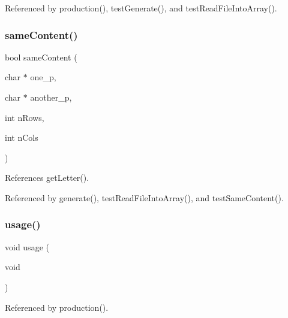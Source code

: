 Referenced by production(), test\+Generate(), and test\+Read\+File\+Into\+Array().

\mbox{\label{production_8h_a6bc14537b7dc8361ace9f0ee6aa49440}} 
\subsubsection{same\+Content()}
{\footnotesize\ttfamily bool same\+Content (\begin{DoxyParamCaption}\item[{char $\ast$}]{one\+\_\+p,  }\item[{char $\ast$}]{another\+\_\+p,  }\item[{int}]{n\+Rows,  }\item[{int}]{n\+Cols }\end{DoxyParamCaption})}



References get\+Letter().



Referenced by generate(), test\+Read\+File\+Into\+Array(), and test\+Same\+Content().

\mbox{\label{production_8h_ae8605e2b78cd4a81b6c6b5c30cb7366a}} 
\subsubsection{usage()}
{\footnotesize\ttfamily void usage (\begin{DoxyParamCaption}\item[{void}]{ }\end{DoxyParamCaption})}



Referenced by production().

